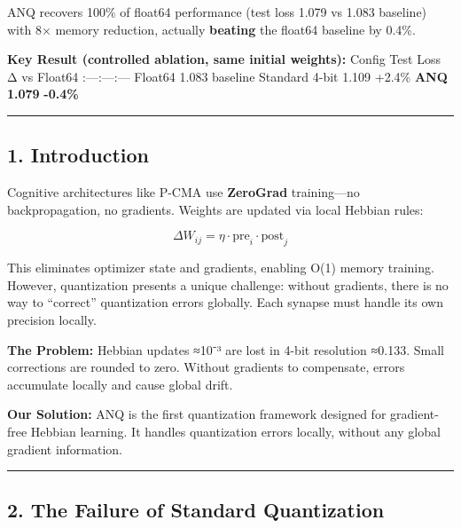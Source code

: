 \documentclass[
  11pt,
  a4paper,
]{article}
\begin{document}
ANQ recovers 100\% of float64 performance (test loss 1.079 vs 1.083
baseline) with 8× memory reduction, actually \textbf{beating} the
float64 baseline by 0.4\%.

\textbf{Key Result (controlled ablation, same initial weights):}
\textbar{} Config \textbar{} Test Loss \textbar{} Δ vs Float64
\textbar{} \textbar:---\textbar:---\textbar:---\textbar{} \textbar{}
Float64 \textbar{} 1.083 \textbar{} baseline \textbar{} \textbar{}
Standard 4-bit \textbar{} 1.109 \textbar{} +2.4\% \textbar{} \textbar{}
\textbf{ANQ} \textbar{} \textbf{1.079} \textbar{} \textbf{-0.4\%}
\textbar{}

\begin{center}\rule{0.5\linewidth}{0.5pt}\end{center}

\subsection{1. Introduction}\label{introduction}

Cognitive architectures like P-CMA use \textbf{ZeroGrad} training---no
backpropagation, no gradients. Weights are updated via local Hebbian
rules:

\[
\Delta W_{ij} = \eta \cdot \text{pre}_i \cdot \text{post}_j
\]

This eliminates optimizer state and gradients, enabling O(1) memory
training. However, quantization presents a unique challenge: without
gradients, there is no way to ``correct'' quantization errors globally.
Each synapse must handle its own precision locally.

\textbf{The Problem:} Hebbian updates ≈10⁻³ are lost in 4-bit resolution
≈0.133. Small corrections are rounded to zero. Without gradients to
compensate, errors accumulate locally and cause global drift.

\textbf{Our Solution:} ANQ is the first quantization framework designed
for gradient-free Hebbian learning. It handles quantization errors
locally, without any global gradient information.

\begin{center}\rule{0.5\linewidth}{0.5pt}\end{center}

\subsection{2. The Failure of Standard
Quantization}\label{the-failure-of-standard-quantization}
\end{document}
